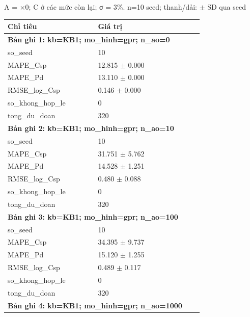 \par\smallskip\noindent A = ×0; C ở các mức còn lại; σ = 3\%. n=10 seed; thanh/dải: $\pm$ SD qua seed\par
\begin{longtable}{p{0.43\linewidth}p{0.50\linewidth}}
\toprule Chỉ tiêu & Giá trị \\ \midrule \endhead
\multicolumn{2}{p{0.95\linewidth}}{\textbf{Bản ghi 1: kb=KB1; mo\_hinh=gpr; n\_ao=0}} \\
so\_\allowbreak seed & 10 \\
MAPE\_\allowbreak Csp & 12.815 $\pm$ 0.000 \\
MAPE\_\allowbreak Pd & 13.110 $\pm$ 0.000 \\
RMSE\_\allowbreak log\_\allowbreak Csp & 0.146 $\pm$ 0.000 \\
so\_\allowbreak khong\_\allowbreak hop\_\allowbreak le & 0 \\
tong\_\allowbreak du\_\allowbreak doan & 320 \\
\midrule
\multicolumn{2}{p{0.95\linewidth}}{\textbf{Bản ghi 2: kb=KB1; mo\_hinh=gpr; n\_ao=10}} \\
so\_\allowbreak seed & 10 \\
MAPE\_\allowbreak Csp & 31.751 $\pm$ 5.762 \\
MAPE\_\allowbreak Pd & 14.528 $\pm$ 1.251 \\
RMSE\_\allowbreak log\_\allowbreak Csp & 0.480 $\pm$ 0.088 \\
so\_\allowbreak khong\_\allowbreak hop\_\allowbreak le & 0 \\
tong\_\allowbreak du\_\allowbreak doan & 320 \\
\midrule
\multicolumn{2}{p{0.95\linewidth}}{\textbf{Bản ghi 3: kb=KB1; mo\_hinh=gpr; n\_ao=100}} \\
so\_\allowbreak seed & 10 \\
MAPE\_\allowbreak Csp & 34.395 $\pm$ 9.737 \\
MAPE\_\allowbreak Pd & 15.120 $\pm$ 1.255 \\
RMSE\_\allowbreak log\_\allowbreak Csp & 0.489 $\pm$ 0.117 \\
so\_\allowbreak khong\_\allowbreak hop\_\allowbreak le & 0 \\
tong\_\allowbreak du\_\allowbreak doan & 320 \\
\midrule
\multicolumn{2}{p{0.95\linewidth}}{\textbf{Bản ghi 4: kb=KB1; mo\_hinh=gpr; n\_ao=1000}} \\

\end{longtable}
